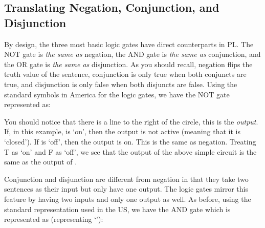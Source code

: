 \subsection{Translating Negation, Conjunction, and Disjunction}

By design, the three most basic logic gates have direct counterparts in PL. The NOT gate is \emph{the same as} negation, the AND gate is \emph{the same as} conjunction, and the OR gate is \emph{the same as} disjunction. As you should recall, negation flips the truth value of the sentence, conjunction is only true when both conjuncts are true, and disjunction is only false when both disjuncts are false. Using the standard symbols in America for the logic gates, we have the NOT gate represented as:


You should notice that there is a line to the right of the circle, this is the \emph{output}. If, in this example,  is `on', then the output is not active (meaning that it is `closed'). If  is `off', then the output is on. This is the same as negation. Treating T as `on' and F as `off', we see that the output of the above simple circuit is the same as the output of \enot{}. 

Conjunction and disjunction are different from negation in that they take two sentences as their input but only have one output. The logic gates mirror this feature by having two inputs and only one output as well. As before, using the standard representation used in the US, we have the AND gate which is represented as (representing `\eand{}'):


